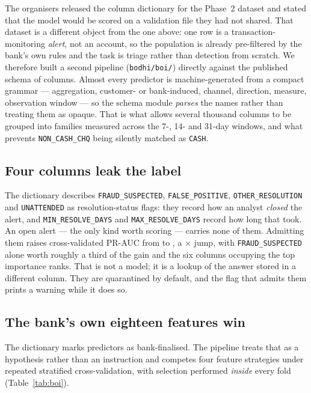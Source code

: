 \documentclass{article}
\begin{document}
The organisers released the column dictionary for the Phase~2 dataset and stated
that the model would be scored on a validation file they had not shared. That
dataset is a different object from the one above: one row is a
transaction-monitoring \emph{alert}, not an account, so the population is already
pre-filtered by the bank's own rules and the task is triage rather than detection
from scratch. We therefore built a second pipeline (\texttt{bodhi/boi/}) directly
against the published schema of \boiColumns{} columns. Almost every predictor is
machine-generated from a compact grammar --- aggregation, customer- or
bank-induced, channel, direction, measure, observation window --- so the schema
module \emph{parses} the names rather than treating them as opaque. That is what
allows several thousand columns to be grouped into families measured across the
7-, 14- and 31-day windows, and what prevents \texttt{NON\_CASH\_CHQ} being
silently matched as \texttt{CASH}.

\subsection{Four columns leak the label}

The dictionary describes \texttt{FRAUD\_SUSPECTED}, \texttt{FALSE\_POSITIVE},
\texttt{OTHER\_RESOLUTION} and \texttt{UNATTENDED} as resolution-status flags:
they record how an analyst \emph{closed} the alert, and
\texttt{MIN\_RESOLVE\_DAYS} and \texttt{MAX\_RESOLVE\_DAYS} record how long that
took. An open alert --- the only kind worth scoring --- carries none of them.
Admitting them raises cross-validated PR-AUC from \boiPrClean{} to
\boiPrLeaked{}, a \boiLeakMultiple{}$\times$ jump, with \texttt{FRAUD\_SUSPECTED}
alone worth roughly a third of the gain and the six columns occupying the top
importance ranks. That is not a model; it is a lookup of the answer stored in a
different column. They are quarantined by default, and the flag that admits them
prints a warning while it does so.

\subsection{The bank's own eighteen features win}

The dictionary marks \boiBankN{} predictors as bank-finalised. The pipeline
treats that as a hypothesis rather than an instruction and competes four feature
strategies under repeated stratified cross-validation, with selection performed
\emph{inside} every fold (Table~\ref{tab:boi}).
\end{document}
